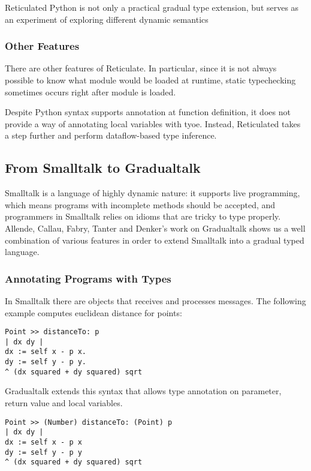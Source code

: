 Reticulated Python is not only a practical gradual type extension,
but serves as an experiment of exploring different dynamic semantics

\subsubsection{Other Features}

There are other features of Reticulate.
In particular, since it is not always possible to know what module would be loaded
at runtime, static typechecking sometimes occurs right after module is loaded.

Despite Python syntax supports annotation at function definition,
it does not provide a way of annotating local variables with tyoe.
Instead, Reticulated takes a step further and perform dataflow-based type inference.


\subsection{From Smalltalk to Gradualtalk}

Smalltalk is a language of highly dynamic nature:
it supports live programming, which means programs with incomplete
methods should be accepted, and programmers in Smalltalk relies on
idioms that are tricky to type properly.
Allende, Callau, Fabry, Tanter and Denker's work on Gradualtalk shows
us a well combination of various features in order to extend Smalltalk
into a gradual typed language.

\subsubsection{Annotating Programs with Types}

In Smalltalk there are objects that receives and processes messages.
The following example computes euclidean distance for points:

\begin{verbatim}
Point >> distanceTo: p
| dx dy |
dx := self x - p x.
dy := self y - p y.
^ (dx squared + dy squared) sqrt
\end{verbatim}

Gradualtalk extends this syntax that allows
type annotation on parameter, return value and local variables.

\begin{verbatim}
Point >> (Number) distanceTo: (Point) p
| dx dy |
dx := self x - p x
dy := self y - p y
^ (dx squared + dy squared) sqrt
\end{verbatim}

